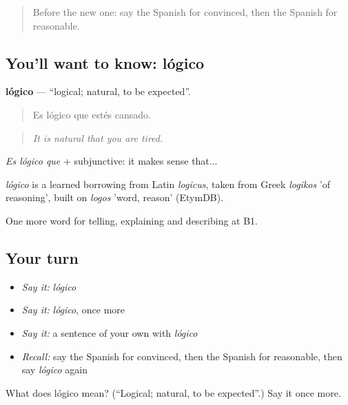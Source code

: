 \label{lesson:ES-C577-logico}



\begin{quote}
Before the new one: say the Spanish for convinced, then the Spanish for reasonable.
\end{quote}

\subsection*{You'll want to know: lógico}
\textbf{lógico} — \textquotedblleft{}logical; natural, to be expected\textquotedblright{}.

\begin{quote}
Es lógico que estés cansado.
\end{quote}

\begin{quote}
\emph{It is natural that you are tired.}
\end{quote}

\emph{Es lógico que} + subjunctive: it makes sense that...

\begin{cousinweb}
\emph{lógico} is a learned borrowing from Latin \emph{logicus}, taken from Greek \emph{logikos} 'of reasoning', built on \emph{logos} 'word, reason' (EtymDB).
\end{cousinweb}

\begin{grammarlens}[title={What you've built}]
One more word for telling, explaining and describing at B1.
\end{grammarlens}

\subsection*{Your turn}
\begin{itemize}
\raggedright
  \item \emph{Say it:} \emph{lógico}
  \item \emph{Say it:} \emph{lógico}, once more
  \item \emph{Say it:} a sentence of your own with \emph{lógico}
  \item \emph{Recall:} say the Spanish for convinced, then the Spanish for reasonable, then say \emph{lógico} again
\end{itemize}

\begin{tcolorbox}[breakable,colback=teal!4,colframe=teal!35!black,title={Before you move on}]
What does lógico mean? (\textquotedblleft{}Logical; natural, to be expected\textquotedblright{}.) Say it once more.
\end{tcolorbox}
